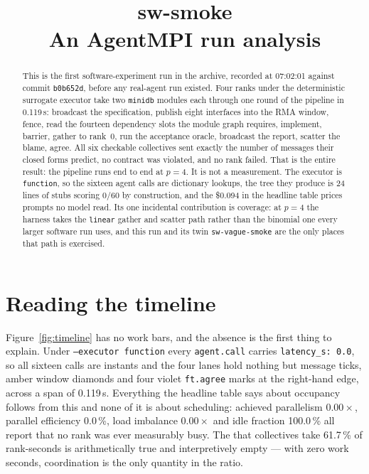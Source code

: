 \documentclass[11pt]{article}
\title{\textbf{sw-smoke}\\[2pt]\large An AgentMPI run analysis}
\author{}
\date{}
\begin{document}
\maketitle

\begin{abstract}
This is the first software-experiment run in the archive, recorded at 07:02:01 against commit
\texttt{b0b652d}, before any real-agent run existed. Four ranks under the deterministic
surrogate executor take two \texttt{minidb} modules each through one round of the pipeline in
0.119\,s: broadcast the specification, publish eight interfaces into the RMA window, fence,
read the fourteen dependency slots the module graph requires, implement, barrier, gather to
rank~0, run the acceptance oracle, broadcast the report, scatter the blame, agree. All six
checkable collectives sent exactly the number of messages their closed forms predict, no
contract was violated, and no rank failed. That is the entire result: the pipeline runs end to
end at $p = 4$. It is not a measurement. The executor is \texttt{function}, so the sixteen
agent calls are dictionary lookups, the tree they produce is 24 lines of stubs scoring 0/60 by
construction, and the \$0.094 in the headline table prices prompts no model read. Its one
incidental contribution is coverage: at $p = 4$ the harness takes the \texttt{linear} gather
and scatter path rather than the binomial one every larger software run uses, and this run and
its twin \texttt{sw-vague-smoke} are the only places that path is exercised.
\end{abstract}



\section{Reading the timeline}

Figure~\ref{fig:timeline} has no work bars, and the absence is the first thing to explain.
Under \texttt{--executor function} every \texttt{agent.call} carries \texttt{latency\_s: 0.0},
so all sixteen calls are instants and the four lanes hold nothing but message ticks, amber
window diamonds and four violet \texttt{ft.agree} marks at the right-hand edge, across a span
of 0.119\,s. Everything the headline table says about occupancy follows from this and none of
it is about scheduling: achieved parallelism $0.00\times$, parallel efficiency 0.0\,\%, load
imbalance $0.00\times$ and idle fraction 100.0\,\% all report that no rank was ever measurably
busy. The  that collectives take 61.7\,\% of rank-seconds is arithmetically true
and interpretively empty --- with zero work seconds, coordination is the only quantity in the
ratio.
\end{document}
